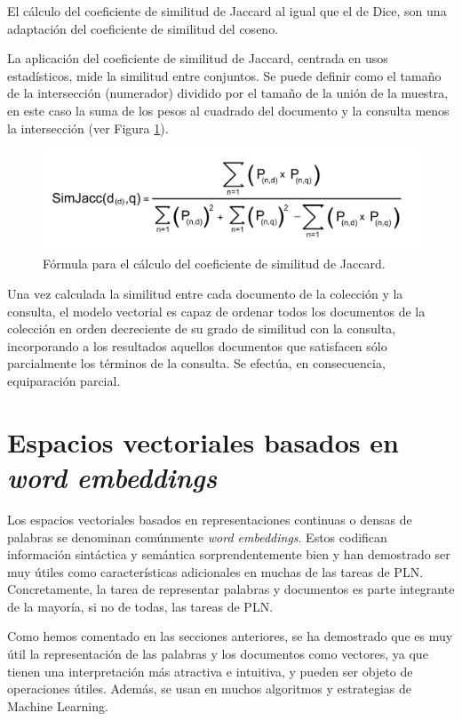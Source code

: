 \documentclass[titlepage]{article}
\begin{document}
El cálculo del coeficiente de similitud de Jaccard al igual que el de Dice, son una adaptación del coeficiente de similitud del coseno. 

La aplicación del coeficiente de similitud de Jaccard, centrada en usos estadísticos, mide la similitud entre conjuntos. Se puede definir como el tamaño de la intersección (numerador) dividido por el tamaño de la unión de la muestra, en este caso la suma de los pesos al cuadrado del documento y la consulta menos la intersección (ver Figura \ref{fig: Figure 5}).

\begin{figure}[h]
	\begin{center}
		\includegraphics*[scale=0.5]{similitud_jaccard.png}
	\end{center}
	\caption{Fórmula para el cálculo del coeficiente de similitud de Jaccard.}
	\label{fig: Figure 5}
\end{figure}

Una vez calculada la similitud entre cada documento de la colección y la consulta, el modelo vectorial es capaz de ordenar todos los documentos de la colección en orden decreciente de su grado de similitud con la consulta, incorporando a los resultados aquellos documentos que satisfacen sólo parcialmente los términos de la consulta. Se efectúa, en consecuencia, equiparación parcial.

\section{Espacios vectoriales basados en \textit{word embeddings}}

Los espacios vectoriales basados en representaciones continuas o densas de palabras se denominan comúnmente \textit{word embeddings}. Estos codifican información sintáctica y semántica sorprendentemente bien y han demostrado ser muy útiles como características adicionales en muchas de las tareas de PLN.  Concretamente, la tarea de representar palabras y documentos es parte integrante de la mayoría, si no de todas, las tareas de PLN. 

Como hemos comentado en las secciones anteriores, se ha demostrado que es muy útil la representación de las palabras y los documentos como vectores, ya que tienen una interpretación más atractiva e intuitiva, y pueden ser objeto de operaciones útiles. Además, se usan en muchos algoritmos y estrategias de Machine Learning.
\end{document}
